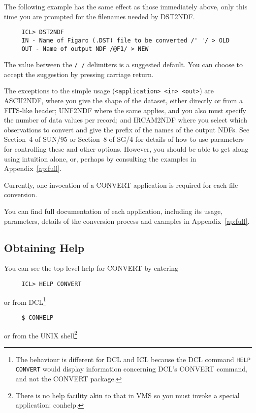The following example has the same effect as those immediately above,
only this time you are prompted for the filenames needed by DST2NDF. 

\small
\begin{verbatim}
     ICL> DST2NDF
     IN - Name of Figaro (.DST) file to be converted /' '/ > OLD
     OUT - Name of output NDF /@F1/ > NEW
\end{verbatim}
\normalsize
The value between the {\tt / /} delimiters is a suggested default.  You
can choose to accept the suggestion by pressing carriage return. 

The exceptions to the simple usage ({\tt <application> <in> <out>}) are
ASCII2NDF, where you give the shape of the dataset, either directly or
from a FITS-like header; UNF2NDF where the same applies, and you also
must specify the number of data values per record; and IRCAM2NDF where
you select which observations to convert and give the prefix of the
names of the output NDFs. See Section~4 of SUN/95 or Section~8 of SG/4
for details of how to use parameters for controlling these and other
options.  However, you should be able to get along using intuition
alone, or, perhaps by consulting the examples in Appendix~\ref{ap:full}.

Currently, one invocation of a {\footnotesize CONVERT} application is
required for each file conversion. 

You can find full documentation of each application, including its
usage, parameters, details of the conversion process and examples in
Appendix~\ref{ap:full}. 

\subsection{Obtaining Help}
You can see the top-level help for {\footnotesize CONVERT} by entering

\small
\begin{verbatim}
     ICL> HELP CONVERT
\end{verbatim}
\normalsize
or from {\footnotesize DCL}\footnote{The behaviour is different for DCL
and ICL because the DCL command {\tt HELP CONVERT} would display
information concerning DCL's CONVERT command, and not the CONVERT package.} 

\small
\begin{verbatim}
     $ CONHELP
\end{verbatim}
\normalsize
or from the UNIX shell\footnote{There is no help facility akin to that
in VMS so you must invoke a special application: conhelp.} 

